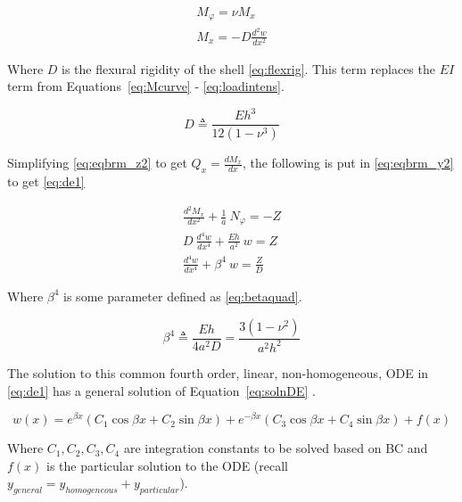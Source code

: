 \begin{equation}
	\label{eq:Mphix}
	\begin{aligned}
		M_\varphi = \nu M_x        \\
		M_x = -D \frac{d^2w}{dx^2} 
	\end{aligned}
\end{equation}

Where $D$ is the flexural rigidity of the shell \ref{eq:flexrig}. This term replaces the $EI$ term from Equations~\ref{eq:Mcurve} - \ref{eq:loadintens}.

\begin{equation}
	\label{eq:flexrig}
	D \triangleq \frac{Eh^3}{12(1-\nu^3)}
\end{equation}

Simplifying \ref{eq:eqbrm_z2} to get $Q_x = \frac{dM_x}{dx}$, the following is put in \ref{eq:eqbrm_y2} to get \ref{eq:de1}

\begin{equation}
	\label{eq:de1}
	\begin{aligned}
		\frac{d^2M_x}{dx^2}+\frac{1}{a} \ N_\varphi = -Z \\
		D\ \frac{d^4w}{dx^4}+\frac{Eh}{a^2} \ w = Z      \\
		\frac{d^4w}{dx^4}+\beta^4 \ w = \frac{Z}{D}      
	\end{aligned}
\end{equation} 

Where $\beta^4$ is some parameter defined as \ref{eq:betaquad}.

\begin{equation}
	\label{eq:betaquad}
	\beta^4 \triangleq \frac{Eh}{4a^2D}= \frac{3(1-\nu^2)}{a^2h^2}
\end{equation}

The solution to this common fourth order, linear, non-homogeneous, ODE in \ref{eq:de1} has a general solution of Equation~\ref{eq:solnDE} \cite{timoshenko1959theory}.

\begin{equation}
	\label{eq:solnDE}
	w(x)=e^{\beta x} \left(C_1 \cos \beta x +C_2 \sin \beta x \right)+e^{-\beta x} \left(C_3 \cos \beta x +C_4 \sin \beta x \right) +f(x)
\end{equation}

Where $ C_1, C_2, C_3, C_4$ are integration constants to be solved based on BC and $f(x)$ is the particular solution to the ODE (recall $y_{general}=y_{homogeneous}+y_{particular}$).\\

